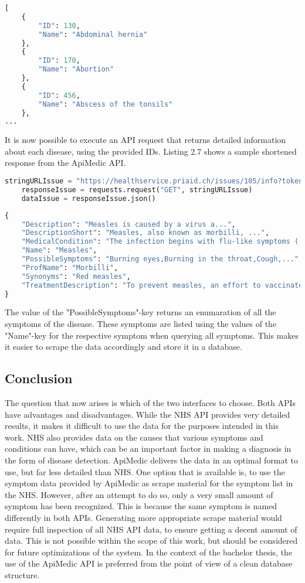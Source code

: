 \begin{lstlisting}[language=Python, caption={Response for the ApiMedic API (all issues)}]
[
	{
		"ID": 130,
		"Name": "Abdominal hernia"	
	},
	{
		"ID": 170,
		"Name": "Abortion"	
	},
	{
		"ID": 456,
		"Name": "Abscess of the tonsils"	
	},
...
\end{lstlisting}
It is now possible to execute an API request that returns detailed information about each disease, using the provided IDs. Listing 2.7 shows a sample shortened response from the ApiMedic API.
\begin{lstlisting}[language=Python, caption={Example Python Request for the ApiMedic API (single issue)}]
	stringURLIssue = "https://healthservice.priaid.ch/issues/105/info?token=YOUR_TOKEN"
	responseIssue = requests.request("GET", stringURLIssue)
	dataIssue = responseIssue.json()
\end{lstlisting}

\begin{lstlisting}[language=Python, caption={Response for the ApiMedic API (single issue)}]
{
	"Description": "Measles is caused by a virus a...",
	"DescriptionShort": "Measles, also known as morbilli, ...",
	"MedicalCondition": "The infection begins with flu-like symptoms ( ...",
	"Name": "Measles",
	"PossibleSymptoms": "Burning eyes,Burning in the throat,Cough,...",
	"ProfName": "Morbilli",
	"Synonyms": "Red measles",
	"TreatmentDescription": "To prevent measles, an effort to vaccinate ..."
}
\end{lstlisting}
\noindent 
The value of the "PossibleSymptoms"-key returns an enumaration of all the symptoms of the disease. These symptoms are listed using the values of the "Name"-key for the respective symptom when querying all symptoms. This makes it easier to scrape the data accordingly and store it in a database.

\subsection{Conclusion}
The question that now arises is which of the two interfaces to choose. Both APIs have advantages and disadvantages. While the NHS API provides very detailed results, it makes it difficult to use the data for the purposes intended in this work. NHS also provides data on the causes that various symptoms and conditions can have, which can be an important factor in making a diagnosis in the form of disease detection. ApiMedic delivers the data in an optimal format to use, but far less detailed than NHS. One option that is available is, to use the symptom data provided by ApiMedic as scrape material for the symptom list in the NHS. However, after an attempt to do so, only a very small amount of symptom has been recognized. This is because the same symptom is named differently in both APIs. Generating more appropriate scrape material would require full inspection of all NHS API data, to ensure getting a decent amount of data. This is not possible within the scope of this work, but should be considered for future optimizations of the system.  In the context of the bachelor thesis, the use of the ApiMedic API is preferred from the point of view of a clean database structure.

